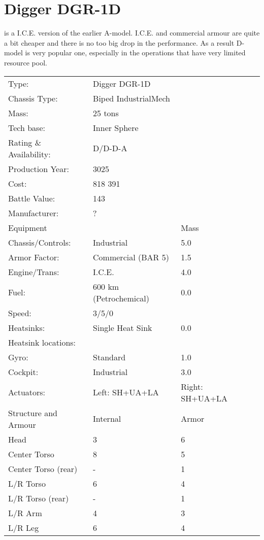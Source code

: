 \documentclass{tufte-book}
\begin{document}
\clearpage
\section{Digger DGR-1D}
 is a I.C.E. version of the earlier A-model. 
I.C.E. and commercial armour are quite a bit cheaper and there
is no too big drop in the performance. As a result D-model is 
very popular one, especially in the operations that have very limited 
resource pool.

\bigskip
\begin{minipage}{\textwidth}
\begin{center}
\begin{tabular}{llll}
\toprule
Type: & Digger DGR-1D & \\
Chassis Type: & Biped IndustrialMech & \\
Mass: & 25 tons & \\
Tech base: & Inner Sphere & \\
Rating \& Availability: & D/D-D-A & \\
Production Year: & 3025 & \\
Cost: & 818 391 & \\
Battle Value: & 143 & \\
Manufacturer: & ? & \\
Equipment & & Mass \\
\quad Chassis/Controls: & Industrial & 5.0 \\
\quad Armor Factor: & Commercial (BAR 5) & 1.5 \\
\quad Engine/Trans: & I.C.E. & 4.0 \\
\quad Fuel: & 600 km (Petrochemical) & 0.0 \\
\quad Speed: & \multicolumn{2}{l}{3/5/0} \\
\quad Heatsinks: & Single Heat Sink & 0.0 \\
\quad Heatsink locations: &  & \\
\quad Gyro: & Standard & 1.0 \\
\quad Cockpit: & Industrial & 3.0 \\
\quad Actuators: & Left: SH+UA+LA & Right: SH+UA+LA \\
Structure and Armour & Internal & Armor \\
\quad Head & 3 & 6 \\
\quad Center Torso & 8 & 5 \\
\quad Center Torso (rear) & - & 1 \\
\quad L/R Torso & 6 & 4 \\
\quad L/R Torso (rear) & - & 1 \\
\quad L/R Arm & 4 & 3 \\
\quad L/R Leg & 6 & 4 \\


\end{tabular}
\end{center}
\end{minipage}
\end{document}
